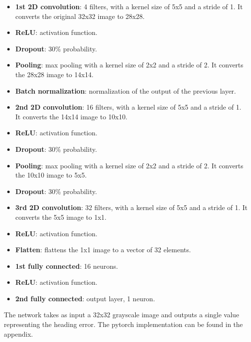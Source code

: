\documentclass[a4paper,12pt,sort&compress]{article}
\begin{document}
    \begin{itemize} %
        \item \textbf{1st 2D convolution}: 4 filters, with a kernel size of 5x5 and a stride of 1.
        It converts the original 32x32 image to 28x28.
        \item \textbf{ReLU}: activation function.
        \item \textbf{Dropout}: 30\% probability.
        \item \textbf{Pooling}: max pooling with a kernel size of 2x2 and a stride of 2. It converts
        the 28x28 image to 14x14.
        \item \textbf{Batch normalization}: normalization of the output of the previous layer.
        \item \textbf{2nd 2D convolution}: 16 filters, with a kernel size of 5x5 and a stride of 1.
        It converts the 14x14 image to 10x10.
        \item \textbf{ReLU}: activation function.
        \item \textbf{Dropout}: 30\% probability.
        \item \textbf{Pooling}: max pooling with a kernel size of 2x2 and a stride of 2. It converts
        the 10x10 image to 5x5.
        \item \textbf{Dropout}: 30\% probability.
        \item \textbf{3rd 2D convolution}: 32 filters, with a kernel size of 5x5 and a stride of 1.
        It converts the 5x5 image to 1x1.
        \item \textbf{ReLU}: activation function.
        \item \textbf{Flatten}: flattens the 1x1 image to a vector of 32 elements.
        \item \textbf{1st fully connected}: 16 neurons.
        \item \textbf{ReLU}: activation function.
        \item \textbf{2nd fully connected}: output layer, 1 neuron.
    \end{itemize}  

    The network takes as input a 32x32 grayscale image and outputs a single value representing the heading
    error. The pytorch implementation can be found in the appendix.
\end{document}
